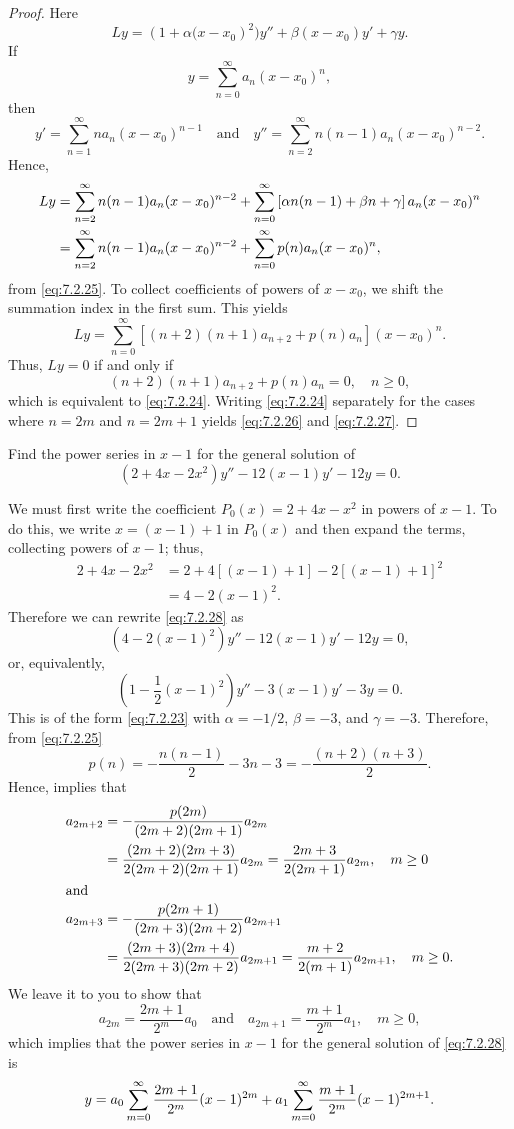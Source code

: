 \begin{proof}
Here
\[
Ly=\left(1+\alpha(x-x_0\right)^2)y''+\beta(x-x_0) y'+\gamma y.
\]
If
\[
y=\sum_{n=0}^\infty a_n(x-x_0)^n,
\]
then
\[
y'=\sum_{n=1}^\infty na_n(x-x_0)^{n-1}
\quad\text{and}\quad y''=\sum_{n=2}^\infty n(n-1)a_n(x-x_0)^{n-2}.
\]
Hence,
\begin{align*}
Ly&=\displaystyle{\sum_{n=2}^\infty n(n-1)a_n(x-x_0)^{n-2}+
\sum_{n=0}^\infty \left[\alpha
n(n-1)
+\beta n+\gamma\right]a_n(x-x_0)^n}\\
&=\displaystyle{\sum_{n=2}^\infty n(n-1)a_n(x-x_0)^{n-2}+\sum_{n=0}^\infty
p(n)a_n(x-x_0)^n},
\end{align*}
from \eqref{eq:7.2.25}.  To collect coefficients of powers of $x-x_0$,
we shift the summation index in the first sum. This yields
\[
Ly=\sum_{n=0}^\infty \left[(n+2)(n+1)a_{n+2}+p(n)a_n\right](x-x_0)^n.
\]
Thus, $Ly=0$ if and only if
\[
(n+2)(n+1)a_{n+2}+p(n)a_n=0,\quad n\ge0,
\]
which is equivalent to \eqref{eq:7.2.24}. Writing \eqref{eq:7.2.24} separately
for the cases where $n=2m$ and $n=2m+1$ yields \eqref{eq:7.2.26} and
\eqref{eq:7.2.27}.
\end{proof}

\begin{example}\label{example:7.2.3}
Find the power series in $x-1$  for the general
solution of
\begin{equation}\label{eq:7.2.28}
(2+4x-2x^2)y''-12(x-1)y'-12y=0.
\end{equation}
\end{example}

\begin{solution}
We must first write the coefficient $P_0(x)=2+4x-x^2$ in powers of
$x-1$. To do this,
 we write $x=(x-1)+1$ in $P_0(x)$ and then expand
the terms, collecting powers of $x-1$;   thus,
\begin{align*}
2+4x-2x^2&=2+4[(x-1)+1]-2[(x-1)+1]^2\\
&=4-2(x-1)^2.
\end{align*}
  Therefore we can rewrite \eqref{eq:7.2.28} as
\[
\left(4-2(x-1)^2\right)y''-12(x-1)y'-12y=0,
\]
or, equivalently,
\[
\left(1-\frac{1}{2}(x-1)^2\right)y''-3(x-1)y'-3y=0.
\]
This is of the form \eqref{eq:7.2.23} with  $\alpha=-1/2$, $\beta=-3$, and
$\gamma=-3$. Therefore, from \eqref{eq:7.2.25}
\[
p(n)=-\frac{n(n-1)}{2}-3n-3=-\frac{(n+2)(n+3)}{2}.
\]
Hence,  implies that
\begin{align*}
a_{2m+2}&=-\frac{p(2m)}{(2m+2)(2m+1)}a_{2m}\\
&=\frac{(2m+2)(2m+3)}{2(2m+2)(2m+1)}
a_{2m}=\frac{2m+3}{2(2m+1)}a_{2m},\quad m\ge0\\
\shortintertext{and}
a_{2m+3}&=-\frac{p(2m+1)}{(2m+3)(2m+2)}a_{2m+1}\\
&=\frac{(2m+3)(2m+4)}{2
(2m+3)(2m+2)}a_{2m+1}=\frac{m+2}{2(m+1)}a_{2m+1},\quad m\ge0.
\end{align*}
We leave it to you to show that
\[
a_{2m}=\frac{2m+1}{2^m}a_0\quad\text{and}\quad
a_{2m+1}=\frac{m+1}{2^m}a_1,\quad m\ge0,
\]
which implies that the power series in $x-1$ for the general solution
of
\eqref{eq:7.2.28} is
\[
y=a_0\sum_{m=0}^\infty\frac{2m+1}{2^m}(x-1)^{2m}+a_1\sum_{m=0}^\infty
\frac{m+1}{2^m}(x-1)^{2m+1}.\qedhere
\]
\end{solution}

